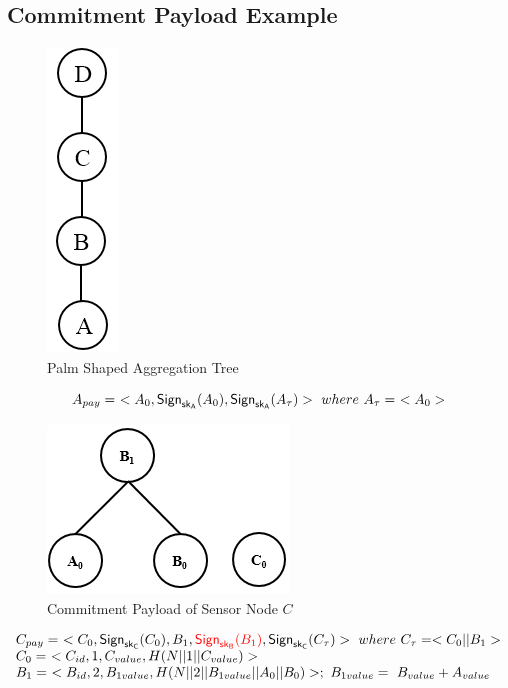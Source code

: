 \documentclass[%
  slidesonly,%
  semlayer%
  ]{seminar}                                  %
\newcommand{\sk}{\sf{sk}}
\begin{document}
\begin{slide}
    \subsection*{Commitment Payload Example}
      \begin{figure}[h!]
        \centering
        \includegraphics[scale = 0.5]{images/palm-aggregation-tree.png}
        \caption{Palm Shaped Aggregation Tree}
        \label{fig:Palm aggregation tree}
      \end{figure}

      \begin{equation}
        A_{pay} =\ <A_{0}, \textsf{Sign}_{\sk_{A}}(A_{0}), \textsf{Sign}_{\sk_{A}}(A_{\tau}) >\ where\ A_{\tau} =\ < A_{0} > 
      \end{equation}

      \begin{figure}[h!]
        \centering
        \includegraphics[scale = 0.5]{images/commitment-payload-of-C.png}
        \caption{Commitment Payload of Sensor Node $C$}
        \label{fig:Commitment payload of C}
      \end{figure}

      \begin{equation*}  
        \begin{array}{l}
          C_{pay} =\ <C_{0},\textsf{Sign}_{\sk_{C}}(C_{0}),B_{1},\textcolor{red}{\textsf{Sign}_{\sk_{B}}(B_{1})}, \textsf{Sign}_{\sk_{C}}(C_{\tau})>\ where\ C_{\tau} = <C_{0} || B_{1}>\\
          C_{0} =\ <C_{id}, 1, C_{value}, H(N||1||C_{value})>\\
          B_{1} =\ <B_{id}, 2, B_{1value}, H(N||2||B_{1value}||A_{0}||B_{0})>;\ B_{1value} =\ B_{value} + A_{value}
        \end{array}
      \end{equation*}
      \clearpage


\end{slide}
\end{document}
